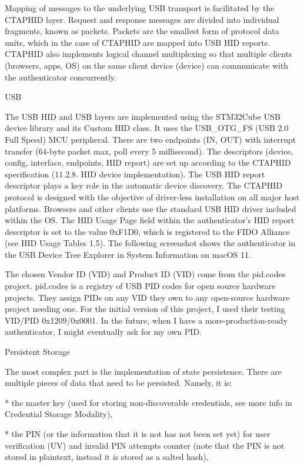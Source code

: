 Mapping of messages to the underlying USB transport is facilitated by the CTAPHID layer. Request and response messages are divided into individual fragments, known as packets. Packets are the smallest form of protocol data units, which in the case of CTAPHID are mapped into USB HID reports. CTAPHID also implements logical channel multiplexing so that multiple clients (browsers, apps, OS) on the same client device (device) can communicate with the authenticator concurrently.


\secc USB

The USB HID and USB layers are implemented using the STM32Cube USB device library and its Custom HID class. It uses the USB_OTG_FS (USB 2.0 Full Speed) MCU peripheral.
There are two endpoints (IN, OUT) with interrupt transfer (64-byte packet max, poll every 5 millisecond). The descriptors (device, config, interface, endpoints, HID report) are set up according to the CTAPHID specification (11.2.8. HID device implementation).
The USB HID report descriptor plays a key role in the automatic device discovery. The CTAPHID protocol is designed with the objective of driver-less installation on all major host platforms. Browsers and other clients use the standard USB HID driver included within the OS. The HID Usage Page field within the authenticator’s HID report descriptor is set to the value 0xF1D0, which is registered to the FIDO Alliance (see HID Usage Tables 1.5).
The following screenshot shows the authenticator in the USB Device Tree Explorer in System Information on macOS 11.

The chosen Vendor ID (VID) and Product ID (VID) come from the pid.codes project.
pid.codes is a registry of USB PID codes for open source hardware projects. They assign PIDs on any VID they own to any open-source hardware project needing one.
For the initial version of this project, I used their testing VID/PID 0x1209/0x0001. In the future, when I have a more-production-ready authenticator, I might eventually ask for my own PID.

\secc Persistent Storage

The most complex part is the implementation of state persistence. There are multiple pieces of data that need to be persisted. Namely, it is:

\begitems

* the master key (used for storing non-discoverable credentials, see more info in Credential Storage Modality),

* the PIN (or the information that it is not has not been set yet) for user verification (UV) and invalid PIN attempts counter (note that the PIN is not stored in plaintext, instead it is stored as a salted hash),

